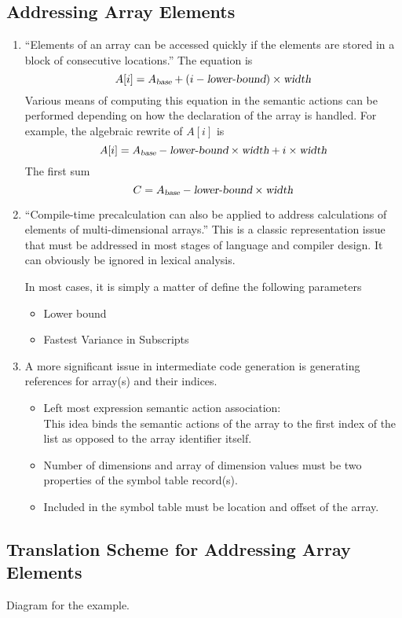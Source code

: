 \subsection  {Addressing Array Elements}
\begin{enumerate}
\item ``Elements of an array can be accessed quickly if the elements are stored in a block of consecutive locations.''  The equation is 
\[ A [i] = A_{\textsl{base}} + ( i - {\textsl{lower-bound} } ) \times \textsl{width} \]
Various means of computing this equation in the semantic actions can be performed depending on how the declaration of the array is handled.   For example, the algebraic rewrite of $A[i]$ is 
\[ A[i] = A_{\textsl{base}} - \textsl{lower-bound} \times \textsl {width} + i \times \textsl{width} \]
The first sum 
\[ C  = A_{\textsl{base}} - \textsl{lower-bound} \times \textsl {width}  \]  
\item ``Compile-time precalculation can also be applied to address calculations of elements of multi-dimensional arrays.''    This is a classic representation issue that must be addressed in most stages of language and compiler design.    It can obviously be ignored in lexical analysis.   

In most cases, it is simply a matter of define the following parameters
\begin{itemize}
\item Lower bound 
\item Fastest Variance in Subscripts
\end{itemize}
\item A more significant issue in intermediate code generation is generating references for array(s) and their indices.  
\begin{itemize}
\item Left most expression semantic action association:  \\
This idea binds the semantic actions of the array to the first index of the list as opposed to the array identifier itself.  
\item Number of dimensions and array of dimension values must be two properties of the symbol table record(s).  
\item Included in the symbol table must be location and offset of the array.  
\end{itemize}

\end{enumerate}

\subsection {Translation Scheme for Addressing Array Elements}
Diagram for the example.  







